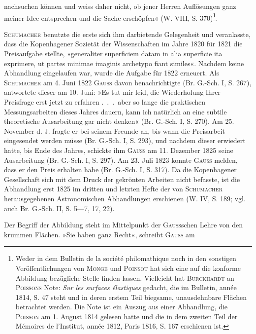 nachsuchen können und weiss daher nicht, ob jener Herren Auflösungen ganz
meiner Idee entsprechen und die Sache erschöpfen« (W. VIII, S. 370)\footnote{Weder in dem Bulletin de la société philomathique noch in den sonstigen Veröffentlichungen von \textsc{Monge} und \textsc{Poinsot} hat sich eine auf die konforme Abbildung bezügliche Stelle finden lassen. Vielleicht hat \textsc{Burckhardt} an \textsc{Poissons} Note: \textit{Sur les surfaces élastiques} gedacht, die im Bulletin, année 1814, S. 47 steht und in deren erstem Teil biegsame, unausdehnbare Flächen betrachtet werden. Die Note ist ein Auszug aus einer Abhandlung, die \textsc{Poisson} am 1. August 1814 gelesen hatte und die in dem zweiten Teil der Mémoires de l’Institut, année 1812, Paris 1816, S. 167 erschienen ist.}.
\par
\textsc{Schumacher} benutzte die erste sich ihm darbietende Gelegenheit und
veranlasste, dass die Kopenhagener Sozietät der Wissenschaften im Jahre 1820
für 1821 die Preisaufgabe stellte, »generaliter superficiem datam in alia superficie
ita exprimere, ut partes minimae imaginis archetypo fiant similes«. Nachdem
keine Abhandlung eingelaufen war, wurde die Aufgabe für 1822 erneuert.
Als \textsc{Schumacher} am 4. Juni 1822 \textsc{Gauss} davon benachrichtigte (Br. G.-Sch. I,
S. 267), antwortete dieser am 10. Juni: »Es tut mir leid, die Wiederholung
Ihrer Preisfrage erst jetzt zu erfahren .\ .\ .\ aber so lange die praktischen
Messungsarbeiten dieses Jahres dauern, kann ich natürlich an eine subtile
theoretische Ausarbeitung gar nicht denken« (Br. G.-Sch. I, S. 270). Am
25. November d. J. fragte er bei seinem Freunde an, bis wann die Preisarbeit
eingesendet werden müsse (Br. G.-Sch. I, S. 293), und nachdem dieser erwiedert
hatte, bis Ende des Jahres, schickte ihm \textsc{Gauss} am 11. Dezember 1825 seine
Ausarbeitung (Br. G.-Sch. I, S. 297). Am 23. Juli 1823 konnte \textsc{Gauss} melden,
\clearpage{}\setcounter{footnote}{0}
\noindent dass er den Preis erhalten habe (Br. G.-Sch. I, S. 317). Da die Kopenhagener
Gesellschaft sich mit dem Druck der gekrönten Arbeiten nicht befasste, ist
die Abhandlung erst 1825 im dritten und letzten Hefte der von \textsc{Schumacher}
herausgegebenen Astronomischen Abhandlungen erschienen (W. IV, S. 189;
vgl. auch Br. G.-Sch. II, S. 5—7, 17, 22).
\par
Der Begriff der Abbildung steht im Mittelpunkt der \textsc{Gauss}schen Lehre
von den krummen Flächen. »Sie haben ganz Recht«, schreibt \textsc{Gauss} am
